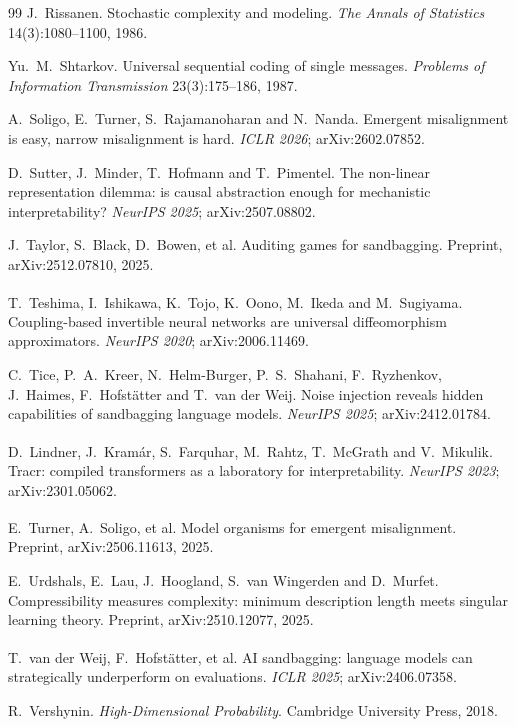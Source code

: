 \documentclass[11pt,a4paper]{article}
\newcommand{\unv}{\textsuperscript{\dag}}
\begin{document}
\begin{thebibliography}{99}
 J.~Rissanen. Stochastic complexity and modeling.
\emph{The Annals of Statistics} 14(3):1080--1100, 1986.

 Yu.~M.~Shtarkov. Universal sequential coding of
single messages. \emph{Problems of Information Transmission}
23(3):175--186, 1987.

 A.~Soligo, E.~Turner, S.~Rajamanoharan and N.~Nanda.
Emergent misalignment is easy, narrow misalignment is hard. \emph{ICLR
2026}; arXiv:2602.07852.

 D.~Sutter, J.~Minder, T.~Hofmann and T.~Pimentel. The
non-linear representation dilemma: is causal abstraction enough for
mechanistic interpretability? \emph{NeurIPS 2025}; arXiv:2507.08802.

 J.~Taylor, S.~Black, D.~Bowen, et al. Auditing games
for sandbagging. Preprint, arXiv:2512.07810, 2025.

\unv{} T.~Teshima, I.~Ishikawa, K.~Tojo, K.~Oono,
M.~Ikeda and M.~Sugiyama. Coupling-based invertible neural networks are
universal diffeomorphism approximators. \emph{NeurIPS 2020};
arXiv:2006.11469.

 C.~Tice, P.~A.~Kreer, N.~Helm-Burger, P.~S.~Shahani,
F.~Ryzhenkov, J.~Haimes, F.~Hofst\"atter and T.~van der Weij. Noise
injection reveals hidden capabilities of sandbagging language models.
\emph{NeurIPS 2025}; arXiv:2412.01784.

\unv{} D.~Lindner, J.~Kram\'ar, S.~Farquhar, M.~Rahtz,
T.~McGrath and V.~Mikulik. Tracr: compiled transformers as a laboratory
for interpretability. \emph{NeurIPS 2023}; arXiv:2301.05062.

\unv{} E.~Turner, A.~Soligo, et al. Model organisms
for emergent misalignment. Preprint, arXiv:2506.11613, 2025.

 E.~Urdshals, E.~Lau, J.~Hoogland, S.~van Wingerden
and D.~Murfet. Compressibility measures complexity: minimum description
length meets singular learning theory. Preprint, arXiv:2510.12077, 2025.

\unv{} T.~van der Weij, F.~Hofst\"atter, et al. AI
sandbagging: language models can strategically underperform on
evaluations. \emph{ICLR 2025}; arXiv:2406.07358.

 R.~Vershynin. \emph{High-Dimensional Probability}.
Cambridge University Press, 2018.


\end{thebibliography}
\end{document}
